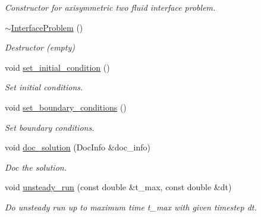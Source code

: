 \begin{DoxyCompactItemize}
\begin{DoxyCompactList}\small\item\em Constructor for axisymmetric two fluid interface problem. \end{DoxyCompactList}\item 
\hyperlink{classInterfaceProblem_a90c191f8046069099b199743e7ce7111}{$\sim$\+Interface\+Problem} ()
\begin{DoxyCompactList}\small\item\em Destructor (empty) \end{DoxyCompactList}\item 
void \hyperlink{classInterfaceProblem_a0d3af8378c4f0a6e38636be958c300d5}{set\+\_\+initial\+\_\+condition} ()
\begin{DoxyCompactList}\small\item\em Set initial conditions. \end{DoxyCompactList}\item 
void \hyperlink{classInterfaceProblem_a844445832ad7a32aa9f5d03ffdb40ebb}{set\+\_\+boundary\+\_\+conditions} ()
\begin{DoxyCompactList}\small\item\em Set boundary conditions. \end{DoxyCompactList}\item 
void \hyperlink{classInterfaceProblem_a49714e35e94f7d2af0b6ddd22b851f52}{doc\+\_\+solution} (Doc\+Info \&doc\+\_\+info)
\begin{DoxyCompactList}\small\item\em Doc the solution. \end{DoxyCompactList}\item 
void \hyperlink{classInterfaceProblem_adf1f4e43d10939e4323e0e315b711085}{unsteady\+\_\+run} (const double \&t\+\_\+max, const double \&dt)
\begin{DoxyCompactList}\small\item\em Do unsteady run up to maximum time t\+\_\+max with given timestep dt. \end{DoxyCompactList}\end{DoxyCompactItemize}
